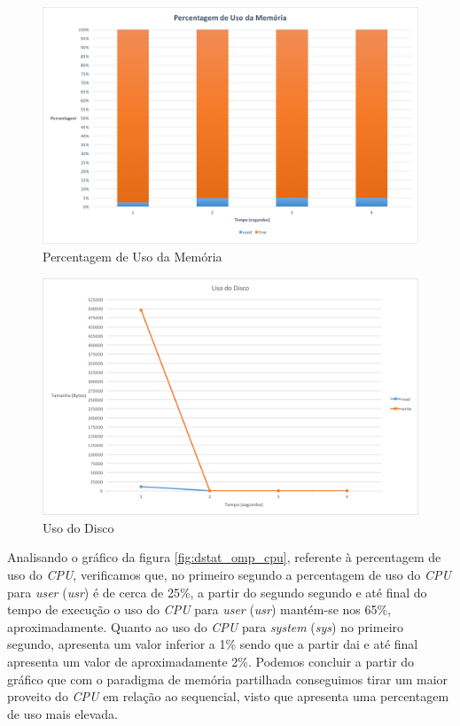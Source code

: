 \documentclass[conference,compsoc]{IEEEtran}
\begin{document}
\begin{figure}[h!]
\centering
\includegraphics[scale=0.325]{dstat/OMP/dstat_omp_memoria.png}
\caption{Percentagem de Uso da Memória}
\label{fig:dstat_omp_memoria}
\end{figure}

\begin{figure}[h!]
\centering
\includegraphics[scale=0.325]{dstat/OMP/dstat_omp_disco.png}
\caption{Uso do Disco}
\label{fig:dstat_omp_disco}
\end{figure}

Analisando o gráfico da figura \ref{fig:dstat_omp_cpu}, referente à percentagem de uso do \textit{CPU}, verificamos que, no primeiro segundo a percentagem de uso do \textit{CPU} para \textit{user} (\textit{usr}) é de cerca de 25\%, a partir do segundo segundo e até final do tempo de execução o uso do \textit{CPU} para \textit{user} (\textit{usr}) mantém-se nos 65\%, aproximadamente. Quanto ao uso do  \textit{CPU} para \textit{system} (\textit{sys}) no primeiro segundo, apresenta um valor inferior a 1\% sendo que a partir dai e até final apresenta um valor de aproximadamente 2\%. Podemos concluir a partir do gráfico que com o paradigma de memória partilhada conseguimos tirar um maior proveito do \textit{CPU} em relação ao sequencial, visto que apresenta uma percentagem de uso mais elevada.
\end{document}
